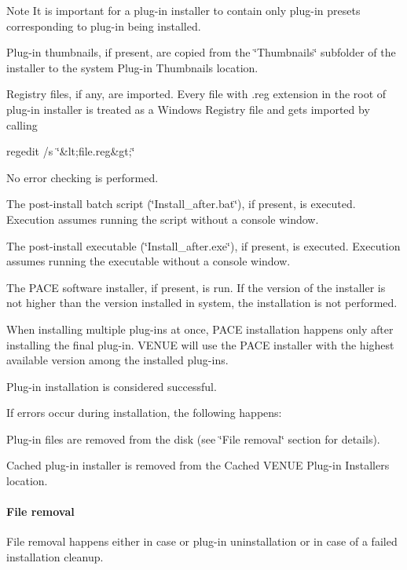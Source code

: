 \begin{DoxyEnumerate}
\begin{DoxyNote}{Note}
It is important for a plug-\/in installer to contain only plug-\/in presets corresponding to plug-\/in being installed.  
\end{DoxyNote}

\item Plug-\/in thumbnails, if present, are copied from the \char`\"{}\+Thumbnails\char`\"{} subfolder of the installer to the system Plug-\/in Thumbnails location.  
\item Registry files, if any, are imported. Every file with .reg extension in the root of plug-\/in installer is treated as a Windows Registry file and gets imported by calling

{\ttfamily regedit /s \char`\"{}\&lt;file.\+reg\&gt;\char`\"{}}

No error checking is performed.  
\item The post-\/install batch script (\char`\"{}\+Install\+\_\+after.\+bat\char`\"{}), if present, is executed. Execution assumes running the script without a console window.  
\item The post-\/install executable (\char`\"{}\+Install\+\_\+after.\+exe\char`\"{}), if present, is executed. Execution assumes running the executable without a console window.  
\item The P\+A\+C\+E software installer, if present, is run. If the version of the installer is not higher than the version installed in system, the installation is not performed.

When installing multiple plug-\/ins at once, P\+A\+C\+E installation happens only after installing the final plug-\/in. V\+E\+N\+U\+E will use the P\+A\+C\+E installer with the highest available version among the installed plug-\/ins.  
\item Plug-\/in installation is considered successful.  
\end{DoxyEnumerate}

 If errors occur during installation, the following happens\+: 
\begin{DoxyEnumerate}
\item Plug-\/in files are removed from the disk (see \char`\"{}\+File removal\char`\"{} section for details). 
\item Cached plug-\/in installer is removed from the Cached V\+E\+N\+U\+E Plug-\/in Installers location. 
\end{DoxyEnumerate}

\hypertarget{a00377_subsubsection__aax_venue_guide__system_details__plugin_installation__removal}{}\paragraph{File removal}\label{a00377_subsubsection__aax_venue_guide__system_details__plugin_installation__removal}
 File removal happens either in case or plug-\/in uninstallation or in case of a failed installation cleanup.

